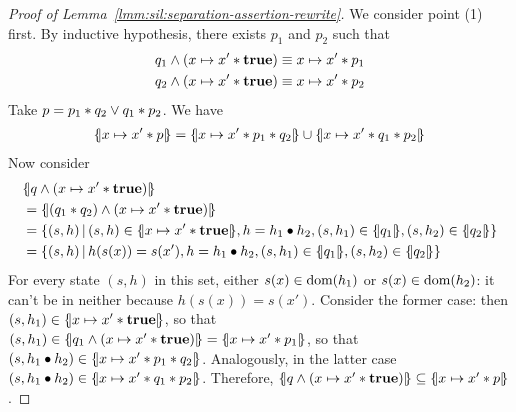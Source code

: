\begin{proof}[Proof of Lemma~\ref{lmm:sil:separation-assertion-rewrite}]
	We consider point (1) first. By inductive hypothesis, there exists $p_1$ and $p_2$ such that
	\begin{align*}
		q_1 \land (x \mapsto x' * \textbf{true}) & \equiv x \mapsto x' * p_1 \\
		q_2 \land (x \mapsto x' * \textbf{true}) & \equiv x \mapsto x' * p_2
	\end{align*}
	Take $p = p_1 * q_2 \lor q_1 * p_2$. We have
	\begin{align*}
		\{\hspace{-2pt}|x \mapsto x' * p|\hspace{-2pt}\} = \{\hspace{-2pt}|x \mapsto x' * p_1 * q_2|\hspace{-2pt}\} \cup \{\hspace{-2pt}|x \mapsto x' * q_1 * p_2|\hspace{-2pt}\}
	\end{align*}
	Now consider
	\begin{align*}
		 & \asldenot{q \land (x \mapsto x' \andsep \true)}                                                                                                                \\
		 & =\asldenot{(q_1 \andsep q_2) \land (x \mapsto x' \andsep \true)}                                                                                               \\
		 & =\lbrace (s, h) \svert (s, h) \in \asldenot{x \mapsto x' \andsep \true}, h = h_1 \bullet h_2, (s, h_1) \in \asldenot{q_1}, (s, h_2) \in \asldenot{q_2} \rbrace \\
		 & =\lbrace (s, h) \svert h(s(x)) = s(x'), h = h_1 \bullet h_2, (s, h_1) \in \asldenot{q_1}, (s, h_2) \in \asldenot{q_2} \rbrace
	\end{align*}
	For every state $(s, h)$ in this set, either $s(x) \in \text{dom}(h_1)$ or $s(x) \in \text{dom}(h_2)$: it can't be in neither because $h(s(x)) = s(x')$. Consider the former case: then $(s, h_1) \in \{\hspace{-2pt}|x \mapsto x' * \textbf{true}|\hspace{-2pt}\}$, so that $(s, h_1) \in \{\hspace{-2pt}|q_1 \land (x \mapsto x' * \textbf{true})|\hspace{-2pt}\} = \{\hspace{-2pt}|x \mapsto x' * p_1|\hspace{-2pt}\}$, so that $(s, h_1 \bullet h_2) \in \{\hspace{-2pt}|x \mapsto x' * p_1 * q_2|\hspace{-2pt}\}$. Analogously, in the latter case $(s, h_1 \bullet h_2) \in \{\hspace{-2pt}|x \mapsto x' * q_1 * p_2|\hspace{-2pt}\}$.
	Therefore, $\{\hspace{-2pt}|q \land (x \mapsto x' * \textbf{true})|\hspace{-2pt}\} \subseteq \{\hspace{-2pt}|x \mapsto x' * p|\hspace{-2pt}\}$.


\end{proof}
